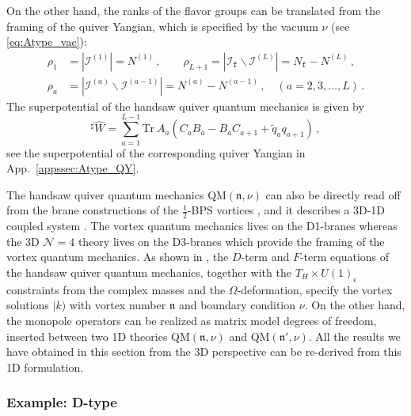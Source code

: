 \documentclass[12pt,a4paper]{article}
\newcommand{\nn}{\mathfrak{n}}
\renewcommand{\(}{\left(}
\renewcommand{\)}{\right)}
\newcommand{\eps}{\epsilon}
\renewcommand{\(}{\left(}
\renewcommand{\)}{\right)}
\begin{document}
On the other hand, the ranks of the flavor groups can be translated from the framing of the quiver Yangian, which is specified by the vacuum $\nu$ (see \eqref{eq:Atype_vac}): 
\begin{equation}\label{eq:rhoDef}
\begin{aligned}
\rho_1&=|\mathcal{I}^{(1)}|=N^{(1)}\,,\qquad \rho_{L+1}=|\mathcal{I}_{\mathtt{f}}\backslash\mathcal{I}^{(L)}|=N_{\mathtt{f}}-N^{(L)}\,,\\
\rho_a&=|\mathcal{I}^{(a)}\backslash\mathcal{I}^{(a-1)}|=N^{(a)}-N^{(a-1)}\,,\quad (a=2,3,\dots,L)\,.
\end{aligned}
\end{equation}
The superpotential of the handsaw quiver quantum mechanics is given by 
\begin{equation}\label{eq:A_potential}
{}^{\sharp}\widehat{W}= \sum_{a=1}^{L-1} \mathrm{Tr}\ A_a(C_a B_a-B_a C_{a+1}+\tilde{q}_a q_{a+1})\,,
\end{equation}
see the superpotential of the corresponding quiver Yangian in App.~\ref{appssec:Atype_QY}. 

The handsaw quiver quantum mechanics QM$(\nn,\nu)$ can also be directly read off from the brane constructions of the $\frac{1}{2}$-BPS vortices \cite{Hanany:2003hp,Bullimore:2016hdc}, and it describes a 3D-1D coupled system \cite{Assel:2015oxa}. 
The vortex quantum mechanics lives on the D1-branes whereas the 3D $\mathcal{N}=4$ theory lives on the D3-branes which provide the framing of the vortex quantum mechanics.
As shown in \cite[Sec.~6]{Bullimore:2016hdc}, the $D$-term and $F$-term equations of the handsaw quiver quantum mechanics, together with the $T_H\times U(1)_\eps$ constraints from the complex masses and the $\Omega$-deformation, specify the vortex solutions $|k)$ with vortex number $\nn$ and boundary condition $\nu$. 
On the other hand, the monopole operators can be realized as matrix model degrees of freedom, inserted between two 1D theories QM$(\nn,\nu)$ and QM$(\nn',\nu)$.
All the results we have obtained in this section from the 3D perspective can be re-derived from this 1D formulation.


\subsubsection{Example: D-type}
\end{document}

